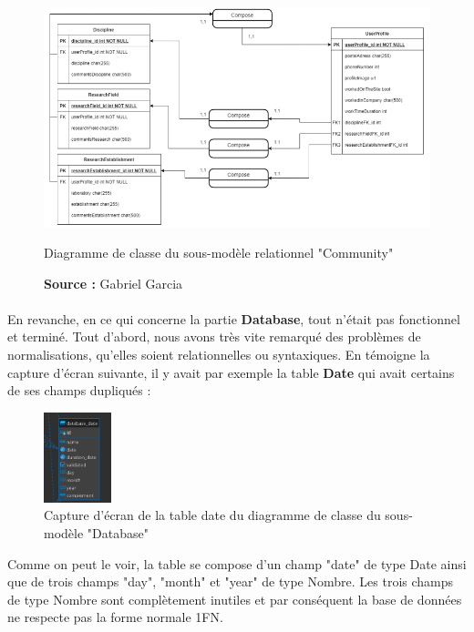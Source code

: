 \begin{figure} [H]
    \centering
    \includegraphics[width=1\textwidth]{assets/web/diagramme_modele_community.png}
    \caption{Diagramme de classe du sous-modèle relationnel "Community"}
    \caption*{\textbf{Source :} Gabriel Garcia}
    \label{fig:diagrammeClasseCommunity}
\end{figure}

\paragraph{} \hspace{10mm}
En revanche, en ce qui concerne la partie \textbf{Database}, tout n'était pas fonctionnel et terminé. Tout d'abord, nous avons très vite remarqué des problèmes de normalisations, qu'elles soient relationnelles ou syntaxiques. En témoigne la capture d'écran suivante, il y avait par exemple la table \textbf{Date} qui avait certains de ses champs dupliqués :

\begin{figure} [H]
    \centering
    \includegraphics[width=0.175\textwidth]{assets/web/table_date.png}
    \caption{Capture d'écran de la table date du diagramme de classe du sous-modèle "Database"}
    \label{fig:tableDateDatabase}
\end{figure}

Comme on peut le voir, la table se compose d'un champ "date" de type Date ainsi que de trois champs "day", "month" et "year" de type Nombre. Les trois champs de type Nombre sont complètement inutiles et par conséquent la base de données ne respecte pas la forme normale 1FN.

